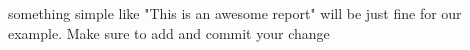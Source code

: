 something simple like "This is an awesome report" will be just fine for our example. Make sure to add and commit your change
